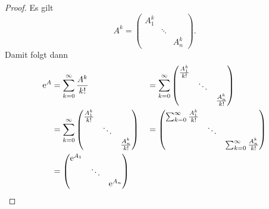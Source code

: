 \begin{proof}
    Es gilt
    \begin{equation*}
        A^k = \begin{pmatrix}
                  A^k_1   &        & \\
                          & \ddots & \\
                          &        & A^k_n
        \end{pmatrix}.
    \end{equation*}
    Damit folgt dann
    \begin{alignat*}{2}
        \mathrm{e}^A
        &= \sum^\infty_{k=0} \frac{A^k}{k!}
            &&= \sum^\infty_{k=0}
            \begin{pmatrix}
                \frac{A^k_1}{k!} &        & \\
                                 & \ddots & \\
                                 &        & \frac{A^k_n}{k!}
            \end{pmatrix}\\
        &= \sum^\infty_{k=0}
            \begin{pmatrix}
                \frac{A^k_1}{k!} &        & \\
                                 & \ddots & \\
                                 &        & \frac{A^k_n}{k!}
            \end{pmatrix}
            &&= \begin{pmatrix}
                    \sum^\infty_{k=0} \frac{A^k_1}{k!} &        & \\
                                                       & \ddots & \\
                                                       &        & \sum^\infty_{k=0} \frac{A^k_n}{k!}
            \end{pmatrix}\\
        &= \begin{pmatrix}
               \mathrm{e}^{A_1} &        & \\
                        & \ddots & \\
                        &        & \mathrm{e}^{A_n}
        \end{pmatrix}
    \end{alignat*}
\end{proof}

